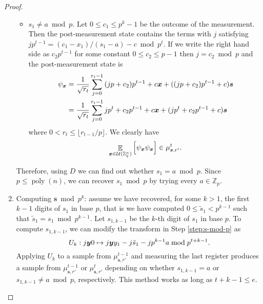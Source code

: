 \documentclass[11pt]{article}
\theoremstyle{plain}
\theoremstyle{definition}
\DeclareMathOperator{\poly}{poly}
\DeclareMathOperator{\E}{\mathbb{E}}
\let\ket\relax
\DeclarePairedDelimiter{\ket}{\lvert}{\rangle}
\let\bra\relax
\DeclarePairedDelimiter{\bra}{\langle}{\rvert}
\def\Z{\mathbb{Z}}
\def\U{\mathcal{U}}
\begin{document}
\begin{proof}
\begin{enumerate}[leftmargin = *, font = \bfseries]
\begin{itemize}
    \item $s_1 \ne a \bmod p$. Let $0 \le c_1 \le p^k - 1$ be the outcome of the measurement. Then the post-measurement state contains the terms with $j$ satisfying $jp^{t -1} = (c_1 - x_1) / (s_1 - a) - c \bmod p^t$. If we write the right hand side as $c_2p^{t - 1}$ for some constant $0 \le c_2 \le p - 1$ then $j = c_2 \bmod p$ and the post-measurement state is 
    \begin{align*}
        \ket{\psi_{\bm{x}}}
        & = \frac{1}{\sqrt{r_t}} \sum_{j = 0}^{r_t - 1} \ket{(jp + c_2)p^{t - 1} + c}\ket{\bm{x} + ((jp + c_2)p^{t - 1} + c)\bm{s}} \\
        & = \frac{1}{\sqrt{r_t}} \sum_{j = 0}^{r_t - 1} \ket{jp^t + c_2p^{t - 1} + c}\ket{\bm{x} + (jp^t + c_2p^{t - 1} + c)\bm{s}}
    \end{align*}
    where $0 < r_t \le \lfloor r_{t - 1} / p \rfloor$. We clearly have
    \[ \E_{\bm{x} \in \U(\Z_q^n)} \Big[ \ket{\psi_{\bm{x}}}\bra{\psi_{\bm{x}}}  \Big] \in \mu_{\bm{s}, r'}^t. \]
    \end{itemize}
    Therefore, using $D$ we can find out whether $s_1 = a \bmod p$. Since $p \le \poly(n)$, we can recover $s_1 \bmod p$ by trying every $a \in \Z_p$.
    \item\label{step:s-mod-pk} Computing $\bm{s} \bmod p^k$: assume we have recovered, for some $k > 1$, the first $k - 1$ digits of $s_1$ in base $p$, that is we have computed $0 \le \tilde{s}_1 < p^{k - 1}$ such that $\tilde{s}_1 = s_1 \bmod p^{k - 1}$. Let $s_{1, k - 1}$ be the $k$-th digit of $s_1$ in base $p$. To compute $s_{1, k - 1}$, we can modify the transform in Step \ref{step:s-mod-p} as
    \begin{equation*}
        U_k: \ket{j}\ket{\bm{y}}\ket{0} \mapsto \ket{j}\ket{\bm{y}}\ket{y_1 - j\tilde{s}_1 - jp^{k - 1}a \bmod p^{t + k - 1}}.
    \end{equation*}
    Applying $U_k$ to a sample from $\mu_{\bm{s}, r'}^{t - 1}$ and measuring the last register produces a sample from $\mu_{\bm{s}, r'}^{t - 1}$ or $\mu_{\bm{s}, r'}^t$ depending on whether $s_{1, k - 1} = a$ or $s_{1, k - 1} \ne a \bmod p$, respectively. This method works as long as $t + k - 1 \le e$.
    

\end{enumerate}
\end{proof}
\end{document}
